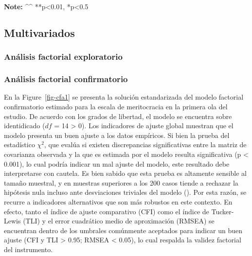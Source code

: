\documentclass[
  12pt,
]{article}
\begin{document}
\begin{longtable}[]
\end{longtable}

\textbf{Note:} \^{}\^{} **p\textless0.01, *p\textless0.5

\subsection{Multivariados}\label{multivariados}

\subsubsection{Análisis factorial
exploratorio}\label{anuxe1lisis-factorial-exploratorio}

\subsubsection{Análisis factorial
confirmatorio}\label{anuxe1lisis-factorial-confirmatorio}

En la Figure~\ref{fig-cfa1} se presenta la solución estandarizada del
modelo factorial confirmatorio estimado para la escala de meritocracia
en la primera ola del estudio. De acuerdo con los grados de libertad, el
modelo se encuentra sobre identidicado (\(df\) = 14 \textgreater{} 0).
Los indicadores de ajuste global muestran que el modelo presenta un buen
ajuste a los datos empíricos. Si bien la prueba del estadístico
\(\chi^2\), que evalúa si existen discrepancias significativas entre la
matriz de covarianza observada y la que es estimada por el modelo
resulta significativa (p \textless{} 0.001), lo cual podría indicar un
mal ajuste del modelo, este resultado debe interpretarse con cautela. Es
bien sabido que esta prueba es altamente sensible al tamaño muestral, y
en muestras superiores a los 200 casos tiende a rechazar la hipótesis
nula incluso ante desviaciones triviales del modelo
(). Por esta razón,
se recurre a indicadores alternativos que son más robustos en este
contexto. En efecto, tanto el índice de ajuste comparativo (CFI) como el
índice de Tucker-Lewis (TLI) y el error cuadrático medio de aproximación
(RMSEA) se encuentran dentro de los umbrales comúnmente aceptados para
indicar un buen ajuste (CFI y TLI \textgreater{} 0.95; RMSEA \textless{}
0.05), lo cual respalda la validez factorial del instrumento.
\end{document}
